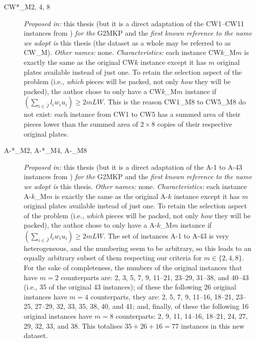 \documentclass[ppgc,tese,english,formais,babel]{iiufrgs}
\begin{document}
\begin{description}
\item [CW*\_M{2, 4, 8}] \emph{Proposed in:} this thesis (but it is a direct adaptation of the CW1--CW11 instances from \citet{fayard:1998}) \emph{for the} G2MKP and the \emph{first known reference to the name we adopt is} this thesis (the dataset as a whole may be referred to as CW\_M). \emph{Other names:} none. \emph{Characteristics:} each instance CW\(k\)\_M\(m\) is exactly the same as the original CW\(k\) instance except it has \(m\) original plates available instead of just one. To retain the selection aspect of the problem (i.e., \emph{which} pieces will be packed, not only \emph{how} they will be packed), the author chose to only have a CW\(k\)\_M\(m\) instance if \((\sum_{i \in \bar{J}} l_i w_i u_i) \geq 2 m L W\). This is the reason CW1\_M8 to CW5\_M8 do not exist: each instance from CW1 to CW5 has a summed area of their pieces lower than the summed area of \(2 \times 8\) copies of their respective original plates.
\item [A-*\_M2, A-*\_M4, A-\_M8] \emph{Proposed in:} this thesis (but it is a direct adaptation of the A-1 to A-43 instances from \citet{macedo:2010}) \emph{for the} G2MKP and the \emph{first known reference to the name we adopt is} this thesis. \emph{Other names:} none. \emph{Characteristics:} each instance A-\(k\)\_M\(m\) is exactly the same as the original A-\(k\) instance except it has \(m\) original plates available instead of just one. To retain the selection aspect of the problem (i.e., \emph{which} pieces will be packed, not only \emph{how} they will be packed), the author chose to only have a A-\(k\)\_M\(m\) instance if \((\sum_{i \in \bar{J}} l_i w_i u_i) \geq 2 m L W\). The set of instances A-1 to A-43 is very heterogeneous, and the numbering seem to be arbitrary, so this leads to an equally arbitrary subset of them respecting our criteria for \(m \in \{2, 4, 8\}\). For the sake of completeness, the numbers of the original instances that have \(m = 2\) counterparts are: 2, 3, 5, 7, 9, 11--21, 23--29, 31--38, and 40--43 (i.e., 35 of the original 43 instances); of these the following 26 original instances have \(m = 4\) counterparts, they are: 2, 5, 7, 9, 11--16, 18--21, 23--25, 27--29, 32, 33, 35, 38, 40, and 41; and, finally, of these the following 16 original instances have \(m = 8\) counterparts: 2, 9, 11, 14--16, 18--21, 24, 27, 29, 32, 33, and 38. This totalises \(35 + 26 + 16 = 77\) instances in this new dataset.
\end{description}
\end{document}
